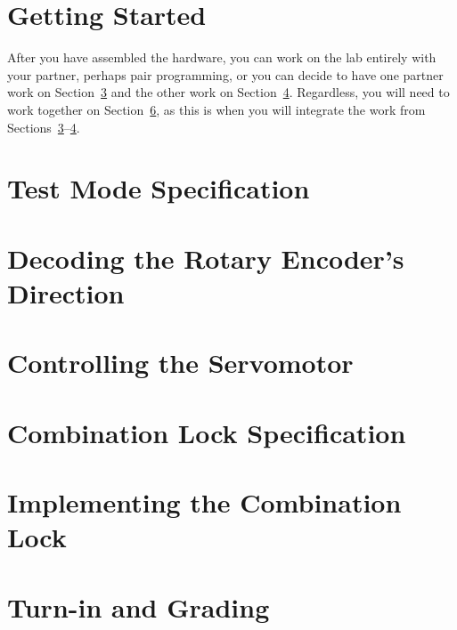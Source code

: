     \section{Getting Started} \label{sec:GettingStarted}                

    \vspace{1cm}

    After you have assembled the hardware, you can work on the lab entirely with your partner, perhaps pair programming,
    or you can decide to have one partner work on Section~\ref{sec:rotaryEncoder} and the other work on Section~\ref{sec:servo}.
    Regardless, you will need to work together on Section~\ref{sec:integration}, as this is when you will integrate the work from Sections~\ref{sec:rotaryEncoder}--\ref{sec:servo}.

    \section{Test Mode Specification} \label{sec:testMode}              

    \section{Decoding the Rotary Encoder's Direction} \label{sec:rotaryEncoder}     

    \section{Controlling the Servomotor} \label{sec:servo}              

    \section{Combination Lock Specification} \label{sec:spec}           

    \section{Implementing the Combination Lock} \label{sec:integration} 

    \section{Turn-in and Grading}                                       


